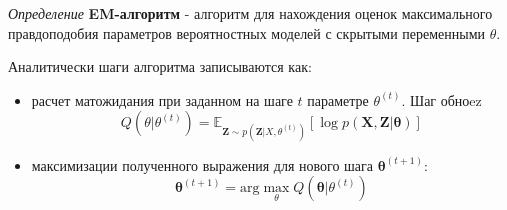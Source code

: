 \textit{Определение} \textbf{EM-алгоритм} - алгоритм для нахождения оценок
максимального правдоподобия параметров  вероятностных моделей с скрытыми переменными $\theta$.

Аналитически шаги алгоритма записываются как: \begin{itemize}
    \item расчет матожидания при заданном на шаге $t$ параметре $\theta^{(t)}$.
    Шаг обноez \begin{equation}
        Q(\theta| \theta^{(t)}) = \mathbb{E}_{\mathbf{Z} \sim p(\mathbf{Z}|X,\theta^{(t)})} \left[ \log p(\mathbf{X},\mathbf{Z}|\mathbf{\theta})\right]
    \end{equation}
    \item максимизации полученного выражения для нового шага $\mathbf{\theta}^{(t+1)}$: \begin{equation}
        \mathbf{\theta}^{(t+1)} = \text{arg} \max_{\theta} Q(\mathbf{\theta}|\theta^{(t)})
    \end{equation}  
\end{itemize}




